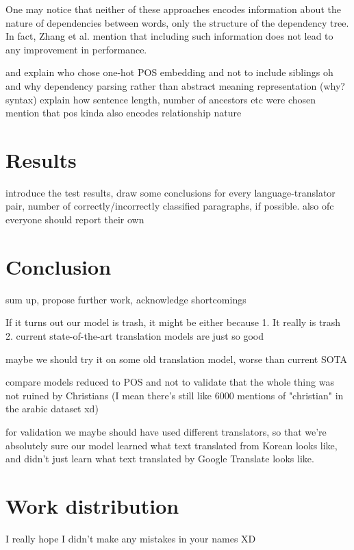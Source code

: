 \documentclass[twocolumn]{article}
\begin{document}
One may notice that neither of these approaches encodes information about the nature of dependencies between words, only the structure of the dependency tree. In fact, Zhang et al. mention that including such information does not lead to any improvement in performance.



and explain who chose one-hot POS embedding and not to include siblings oh and why dependency parsing rather than abstract meaning representation (why? syntax)
explain how sentence length, number of ancestors etc were chosen
mention that pos kinda also encodes relationship nature

\section*{Results}

introduce the test results, draw some conclusions
for every language-translator pair, number of correctly/incorrectly classified paragraphs, if possible. also ofc everyone should report their own

\section*{Conclusion}

sum up, propose further work, acknowledge shortcomings

If it turns out our model is trash, it might be either because 1. It really is trash 2. current state-of-the-art translation models are just so good

maybe we should try it on some old translation model, worse than current SOTA

compare models reduced to POS and not to validate that the whole thing was not ruined by Christians (I mean there's still like 6000 mentions of "christian" in the arabic dataset xd)

for validation we maybe should have used different translators, so that we're absolutely sure our model learned what text translated from Korean looks like, and didn't just learn what text translated by Google Translate looks like.



\section*{Work distribution}

I really hope I didn't make any mistakes in your names XD
\end{document}
